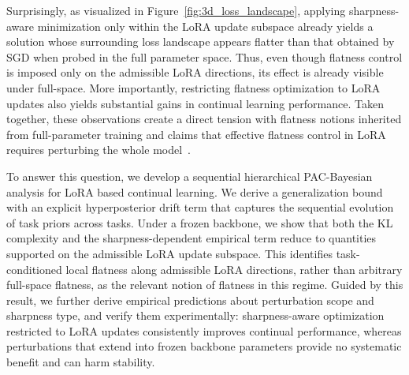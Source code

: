 \documentclass[10pt]{article} %
\begin{document}
Surprisingly, as visualized in Figure~\ref{fig:3d_loss_landscape}, applying sharpness-aware minimization only within the LoRA update subspace already yields a solution whose surrounding loss landscape appears flatter than that obtained by SGD when probed in the full parameter space. Thus, even though flatness control is imposed only on the admissible LoRA directions, its effect is already visible under full-space. More importantly, restricting flatness optimization to LoRA updates also yields substantial gains in continual learning performance. Taken together, these observations create a direct tension with flatness notions inherited from full-parameter training and claims that effective flatness control in LoRA requires perturbing the whole model~\cite{li2024flatlora}.


To answer this question, we develop a sequential hierarchical PAC-Bayesian analysis for LoRA based continual learning. We derive a generalization bound with an explicit hyperposterior drift term that captures the sequential evolution of task priors across tasks. Under a frozen backbone, we show that both the KL complexity and the sharpness-dependent empirical term reduce to quantities supported on the admissible LoRA update subspace. This identifies task-conditioned local flatness along admissible LoRA directions, rather than arbitrary full-space flatness, as the relevant notion of flatness in this regime. Guided by this result, we further derive empirical predictions about perturbation scope and sharpness type, and verify them experimentally: sharpness-aware optimization restricted to LoRA updates consistently improves continual performance, whereas perturbations that extend into frozen backbone parameters provide no systematic benefit and can harm stability.
\end{document}
